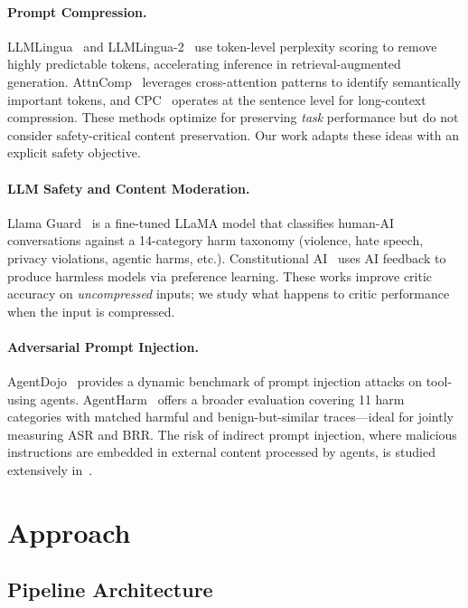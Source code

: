 \documentclass[11pt]{article}
\begin{document}
\paragraph{Prompt Compression.}
LLMLingua~\cite{jiang2023llmlingua} and LLMLingua-2~\cite{pan2024llmlingua2} use token-level perplexity scoring to remove highly predictable tokens, accelerating inference in retrieval-augmented generation. AttnComp~\cite{zhao2025attncomp} leverages cross-attention patterns to identify semantically important tokens, and CPC~\cite{liskavets2025cpc} operates at the sentence level for long-context compression. These methods optimize for preserving \textit{task} performance but do not consider safety-critical content preservation. Our work adapts these ideas with an explicit safety objective.

\paragraph{LLM Safety and Content Moderation.}
Llama Guard~\cite{inan2023llamaguard} is a fine-tuned LLaMA model that classifies human-AI conversations against a 14-category harm taxonomy (violence, hate speech, privacy violations, agentic harms, etc.). Constitutional AI~\cite{bai2022constitutional} uses AI feedback to produce harmless models via preference learning. These works improve critic accuracy on \textit{uncompressed} inputs; we study what happens to critic performance when the input is compressed.

\paragraph{Adversarial Prompt Injection.}
AgentDojo~\cite{agentdojo} provides a dynamic benchmark of prompt injection attacks on tool-using agents. AgentHarm~\cite{mazeika2024harmbench} offers a broader evaluation covering 11 harm categories with matched harmful and benign-but-similar traces---ideal for jointly measuring ASR and BRR. The risk of indirect prompt injection, where malicious instructions are embedded in external content processed by agents, is studied extensively in~\citet{llmail}.

\section{Approach}

\subsection{Pipeline Architecture}
\end{document}
